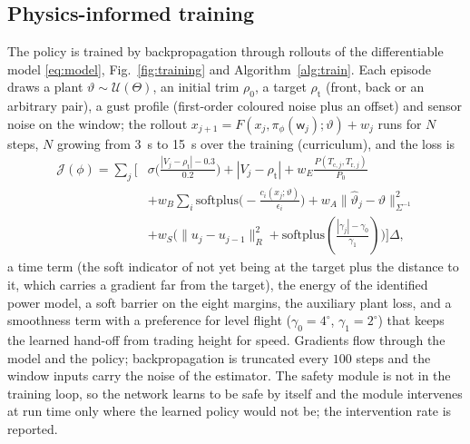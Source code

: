 \documentclass[final,5p,times,twocolumn]{elsarticle}
\begin{document}
\subsection{Physics-informed training}
The policy is trained by backpropagation through rollouts of the differentiable model \eqref{eq:model}, Fig.~\ref{fig:training} and Algorithm~\ref{alg:train}. Each episode draws a plant $\vartheta\sim\mathcal U(\Theta)$, an initial trim $\rho_0$, a target $\rho_{\mathrm t}$ (front, back or an arbitrary pair), a gust profile (first-order coloured noise plus an offset) and sensor noise on the window; the rollout $x_{j+1}=F(x_j,\pi_\phi(\mathsf w_j);\vartheta)+w_j$ runs for $N$ steps, $N$ growing from \SI{3}{s} to \SI{15}{s} over the training (curriculum), and the loss is
\begin{equation}\label{eq:loss}
\begin{aligned}\mathcal J(\phi)=\sum_{j}\Big[&\sigma\big(\tfrac{|V_j-\rho_{\mathrm t}|-0.3}{0.2}\big)+|V_j-\rho_{\mathrm t}|+w_E\tfrac{P(T_{\mathrm c,j},T_{\mathrm r,j})}{P_0}\\ &+w_B\sum_{i}\mathrm{softplus}\big(-\tfrac{c_i(x_j;\vartheta)}{\epsilon_i}\big)+w_A\|\hat\vartheta_j-\vartheta\|_{\Sigma^{-1}}^2\\ &+w_S\big(\|u_j-u_{j-1}\|_R^2+\mathrm{softplus}(\tfrac{|\gamma_j|-\gamma_0}{\gamma_1})\big)\Big]\Delta,\end{aligned}
\end{equation}
a time term (the soft indicator of not yet being at the target plus the distance to it, which carries a gradient far from the target), the energy of the identified power model, a soft barrier on the eight margins, the auxiliary plant loss, and a smoothness term with a preference for level flight ($\gamma_0=4^\circ$, $\gamma_1=2^\circ$) that keeps the learned hand-off from trading height for speed. Gradients flow through the model and the policy; backpropagation is truncated every $100$ steps and the window inputs carry the noise of the estimator. The safety module is not in the training loop, so the network learns to be safe by itself and the module intervenes at run time only where the learned policy would not be; the intervention rate is reported.
\end{document}
